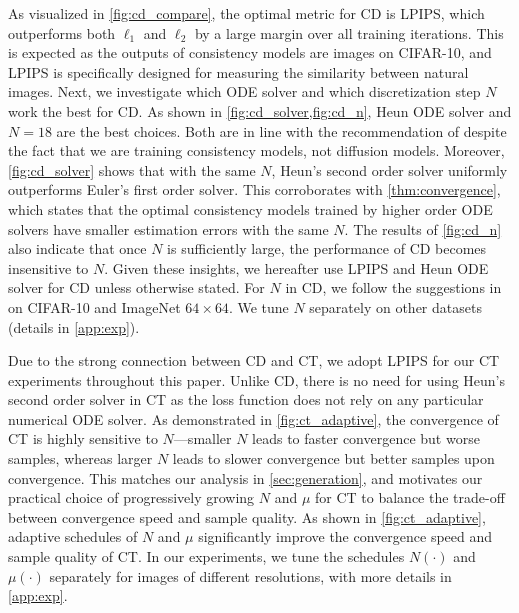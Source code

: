 As visualized in \cref{fig:cd_compare}, the optimal metric for CD is LPIPS, which outperforms both $\ell_1$ and $\ell_2$ by a large margin over all training iterations. This is expected as the outputs of consistency models are images on CIFAR-10, and LPIPS is specifically designed for measuring the similarity between natural images. Next, we investigate which ODE solver and which discretization step $N$ work the best for CD. As shown in \cref{fig:cd_solver,fig:cd_n}, Heun ODE solver and $N=18$ are the best choices. Both are in line with the recommendation of \citet{karras2022edm} despite the fact that we are training consistency models, not diffusion models. Moreover, \cref{fig:cd_solver} shows that with the same $N$, Heun's second order solver uniformly outperforms Euler's first order solver. This corroborates with \cref{thm:convergence}, which states that the optimal consistency models trained by higher order ODE solvers have smaller estimation errors with the same $N$. The results of \cref{fig:cd_n} also indicate that once $N$ is sufficiently large, the performance of CD becomes insensitive to $N$. Given these insights, we hereafter use LPIPS and Heun ODE solver for CD unless otherwise stated. For $N$ in CD, we follow the suggestions in \citet{karras2022edm} on CIFAR-10 and ImageNet $64\times 64$. We tune $N$ separately on other datasets (details in \cref{app:exp}).

Due to the strong connection between CD and CT, we adopt LPIPS for our CT experiments throughout this paper. Unlike CD, there is no need for using Heun's second order solver in CT as the loss function does not rely on any particular numerical ODE solver. As demonstrated in \cref{fig:ct_adaptive}, the convergence of CT is highly sensitive to $N$---smaller $N$ leads to faster convergence but worse samples, whereas larger $N$ leads to slower convergence but better samples upon convergence. This matches our analysis in \cref{sec:generation}, and motivates our practical choice of progressively growing $N$ and $\mu$ for CT to balance the trade-off between convergence speed and sample quality. As shown in \cref{fig:ct_adaptive}, adaptive schedules of $N$ and $\mu$ significantly improve the convergence speed and sample quality of CT. In our experiments, we tune the schedules $N(\cdot)$ and $\mu(\cdot)$ separately for images of different resolutions, with more details in \cref{app:exp}.

